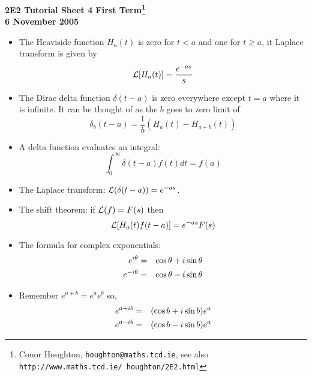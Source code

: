 \documentclass[12pt]{article}
\begin{document}
\begin{center}

{\bf 2E2 Tutorial Sheet 4 First Term\footnote{Conor Houghton, {\tt houghton@maths.tcd.ie}, see also {\tt http://www.maths.tcd.ie/ houghton/2E2.html}}\\[1cm] 6 November 2005}
\end{center}


\renewcommand{\labelenumi}{\arabic{enumi}.}
\begin{itemize}

\item The Heaviside function $H_a(t)$ is zero for $t<a$ and one for $t\ge a$, it Laplace transform is given by
\begin{equation}
{\cal L}[H_a(t)]=\frac{e^{-as}}{s}
\end{equation}

\item The Dirac delta function $\delta(t-a)$ is zero everywhere except
$t=a$ where it is infinite. It can be thought of as the $b$ goes to
zero limit of 
\begin{equation}
\delta_b(t-a)=\frac{1}{b}\left(H_a(t)-H_{a+b}(t)\right)
\end{equation}

\item A delta function evaluates an integral:
\begin{equation}
\int_0^\infty \delta(t-a)f(t)dt=f(a)
\end{equation}

\item The Laplace transform: ${\cal L}(\delta(t-a))=e^{-as}$.

\item The shift theorem: if ${\cal L}(f)=F(s)$ then
\begin{equation}
{\cal L}[H_a(t)f(t-a)]=e^{-as}F(s)
\end{equation}

\item The formula for complex exponentials:
\begin{eqnarray}
e^{i\theta}&=&\cos{\theta}+i\sin{\theta}\cr
e^{-i\theta}&=&\cos{\theta}-i\sin{\theta}
\end{eqnarray}

\item Remember $e^{a+b}=e^a e^b$ so, 
\begin{eqnarray}
e^{a+ib}&=&(\cos{b}+i\sin{b})e^{a}\cr
e^{a-ib}&=&(\cos{b}-i\sin{b})e^{a}
\end{eqnarray}

\end{itemize}
\end{document}
